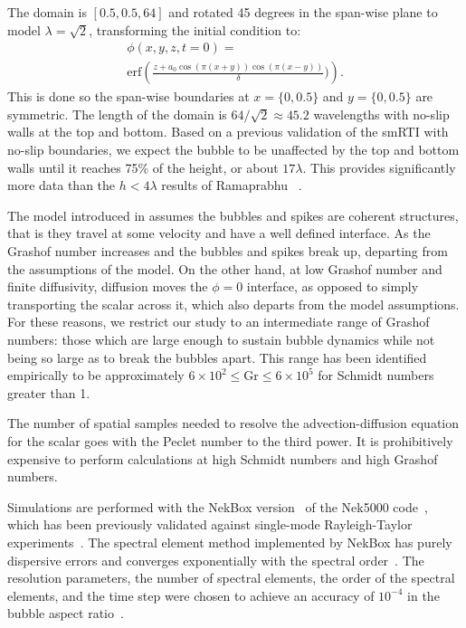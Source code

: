 The domain is $\left[0.5, 0.5, 64\right]$ and rotated 45 degrees in the span-wise plane to model $\lambda = \sqrt{2}$, transforming the initial condition to:
\begin{equation}
\begin{split}
	\phi(x,y,z,t=0) = \\
	\text{erf}\left(\frac{z + a_0 \cos(\pi (x+y)) \cos(\pi (x-y))}{\delta})\right).
\end{split}
\end{equation}
This is done so the span-wise boundaries at $x=\{0,0.5\}$ and $y=\{0,0.5\}$ are symmetric.
The length of the domain is $64/\sqrt{2} \approx 45.2$ wavelengths with no-slip walls at the top and bottom.
Based on a previous validation of the smRTI with no-slip boundaries, we expect the bubble to be unaffected by the top and bottom walls until it reaches 75\% of the height, or about $17\lambda$.
This provides significantly more data than the $h < 4 \lambda$ results of Ramaprabhu \etal~\cite{Ramaprabhu2012}.

The model introduced in  assumes the bubbles and spikes are coherent structures, that is they travel at some velocity and have a well defined interface.
As the Grashof number increases and the bubbles and spikes break up, departing from the assumptions of the model.
On the other hand, at low Grashof number and finite diffusivity, diffusion moves the $\phi = 0$ interface, as opposed to simply transporting the scalar across it, which also departs from the model assumptions.
For these reasons, we restrict our study to an intermediate range of Grashof numbers: those which are large enough to sustain bubble dynamics while not being so large as to break the bubbles apart.
This range has been identified empirically to be approximately $6 \times 10^2 \le \text{Gr} \le 6 \times 10^5$ for Schmidt numbers greater than 1.

The number of spatial samples needed to resolve the advection-diffusion equation for the scalar goes with the Peclet number to the third power.
It is prohibitively expensive to perform calculations at high Schmidt numbers and high Grashof numbers.  

Simulations are performed with the NekBox version~\cite{NekBox} of the Nek5000 code~\cite{argonne:nekdoc}, which has been previously validated against single-mode Rayleigh-Taylor experiments~\cite{Hutchinson2016,Wilkinson2007}.
The spectral element method implemented by NekBox has purely dispersive errors and converges exponentially with the spectral order~\cite{Deville2002}.
The resolution parameters, the number of spectral elements, the order of the spectral elements, and the time step were chosen to achieve an accuracy of $10^{-4}$ in the bubble aspect ratio~\cite{hutchinson2016efficiency}.

